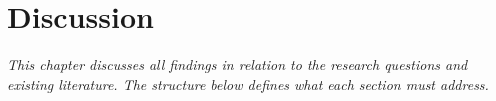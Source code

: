 \chapter{Discussion}

\textit{This chapter discusses all findings in relation to the research questions and
existing literature. The structure below defines what each section must address.}







